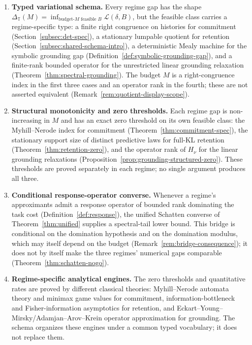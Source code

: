 \documentclass[12pt]{article}
\theoremstyle{definition}
\begin{document}
\begin{enumerate}[label=(\Roman*),leftmargin=2.2em]
\item \textbf{Typed variational schema.}
Every regime gap has the shape
$\Delta_{\mathbb T}(M)=\inf_{\text{budget-}M\text{ feasible }B}
\mathcal L(\delta,B)$,
but the feasible class carries a regime-specific type: a finite right
congruence on histories for commitment (Section~\ref{subsec:det-spec}), a
stationary lumpable quotient for retention
(Section~\ref{subsec:shared-schema-intro}), a deterministic Mealy machine for
the symbolic grounding gap (Definition~\ref{def:symbolic-grounding-gap}), and
a finite-rank bounded operator for the unrestricted linear grounding
relaxation (Theorem~\ref{thm:spectral-grounding}).  The budget $M$ is a
right-congruence index in the first three cases and an operator rank in the
fourth; these are not asserted equivalent
(Remark~\ref{rem:quotient-display-scope}).

\item \textbf{Structural monotonicity and zero thresholds.}
Each regime gap is non-increasing in $M$ and has an exact zero threshold on
its own feasible class: the Myhill--Nerode index for commitment
(Theorem~\ref{thm:commitment-spec}), the stationary support size of distinct
predictive laws for full-KL retention (Theorem~\ref{thm:retention-zero}), and
the operator rank of $H_\nu$ for the linear grounding relaxations
(Proposition~\ref{prop:grounding-structured-zero}).  These thresholds are
proved separately in each regime; no single argument produces all three.

\item \textbf{Conditional response-operator converse.}
Whenever a regime's approximants admit a response operator of bounded rank
dominating the task cost (Definition~\ref{def:response}), the unified
Schatten converse of Theorem~\ref{thm:unified} supplies a spectral-tail lower
bound.  This bridge is conditional on the domination hypothesis and on the
domination modulus, which may itself depend on the budget
(Remark~\ref{rem:bridge-consequence}); it does not by itself make the three
regimes' numerical gaps comparable (Theorem~\ref{thm:schatten-nogo}).

\item \textbf{Regime-specific analytical engines.}
The zero thresholds and quantitative rates are proved by different classical
theories: Myhill--Nerode automata theory and minimax game values for
commitment, information-bottleneck and Fisher-information asymptotics for
retention, and Eckart--Young--Mirsky/Adamjan--Arov--Krein operator
approximation for grounding.  The schema organizes these engines under a
common typed vocabulary; it does not replace them.
\end{enumerate}
\end{document}
